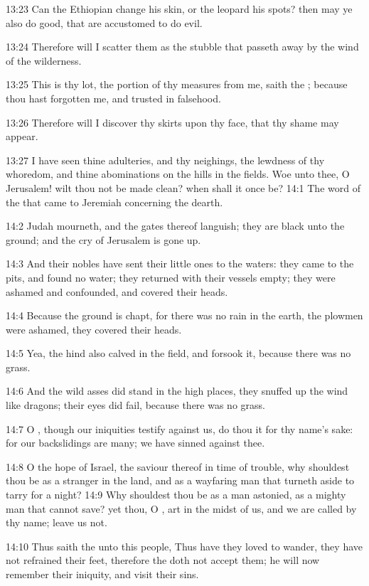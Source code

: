13:23 Can the Ethiopian change his skin, or the leopard his spots?  then may ye also do good, that are accustomed to do evil.

13:24 Therefore will I scatter them as the stubble that passeth away by the wind of the wilderness.

13:25 This is thy lot, the portion of thy measures from me, saith the \LORD; because thou hast forgotten me, and trusted in falsehood.

13:26 Therefore will I discover thy skirts upon thy face, that thy shame may appear.

13:27 I have seen thine adulteries, and thy neighings, the lewdness of thy whoredom, and thine abominations on the hills in the fields. Woe unto thee, O Jerusalem! wilt thou not be made clean? when shall it once be?  14:1 The word of the \LORD that came to Jeremiah concerning the dearth.

14:2 Judah mourneth, and the gates thereof languish; they are black unto the ground; and the cry of Jerusalem is gone up.

14:3 And their nobles have sent their little ones to the waters: they came to the pits, and found no water; they returned with their vessels empty; they were ashamed and confounded, and covered their heads.

14:4 Because the ground is chapt, for there was no rain in the earth, the plowmen were ashamed, they covered their heads.

14:5 Yea, the hind also calved in the field, and forsook it, because there was no grass.

14:6 And the wild asses did stand in the high places, they snuffed up the wind like dragons; their eyes did fail, because there was no grass.

14:7 O \LORD, though our iniquities testify against us, do thou it for thy name's sake: for our backslidings are many; we have sinned against thee.

14:8 O the hope of Israel, the saviour thereof in time of trouble, why shouldest thou be as a stranger in the land, and as a wayfaring man that turneth aside to tarry for a night?  14:9 Why shouldest thou be as a man astonied, as a mighty man that cannot save? yet thou, O \LORD, art in the midst of us, and we are called by thy name; leave us not.

14:10 Thus saith the \LORD unto this people, Thus have they loved to wander, they have not refrained their feet, therefore the \LORD doth not accept them; he will now remember their iniquity, and visit their sins.

